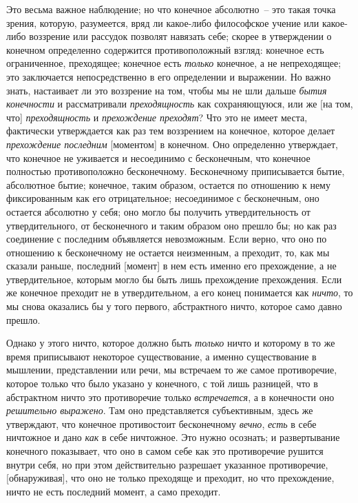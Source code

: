 Это весьма важное наблюдение; но что конечное
абсолютно~-- это такая точка зрения, которую, разумеется,
вряд ли какое-либо философское учение или какое-либо
воззрение или рассудок позволят навязать себе;
скорее в утверждении о конечном определенно содержится
противоположный взгляд: конечное есть ограниченное,
преходящее; конечное есть \emph{только} конечное, а не непреходящее;
это заключается непосредственно в его определении
и выражении. Но важно знать, настаивает ли это
воззрение на том, чтобы мы не шли дальше \emph{бытия конечности}
и рассматривали \emph{преходящность} как сохраняющуюся,
или же [на том, что] \emph{преходящность} и \emph{прехождение
преходят}? Что это не имеет места, фактически утверждается
как раз тем воззрением на конечное, которое
делает \emph{прехождение последним} [моментом] в конечном.
Оно определенно утверждает, что конечное не уживается
и несоединимо с бесконечным, что конечное полностью
противоположно бесконечному. Бесконечному приписывается
бытие, абсолютное бытие; конечное, таким
образом, остается по отношению к нему фиксированным
как его отрицательное; несоединимое с бесконечным, оно
остается абсолютно у себя; оно могло бы получить утвердительность
от утвердительного, от бесконечного и таким
образом оно прешло бы; но как раз соединение с последним
объявляется невозможным. Если верно, что оно по
отношению к бесконечному не остается неизменным, а
преходит, то, как мы сказали раньше, последний [момент]
в нем есть именно его прехождение, а не утвердительное,
которым могло бы быть лишь прехождение прехождения.
Если же конечное преходит не в утвердительном, а его конец
понимается как \emph{ничто}, то мы снова оказались бы у того
первого, абстрактного ничто, которое само давно прешло.

Однако у этого ничто, которое должно быть \emph{только}
ничто и которому в то же время приписывают некоторое
существование, а именно существование в мышлении,
представлении или речи, мы встречаем то же самое противоречие,
которое только что было указано у конечного,
с той лишь разницей, что в абстрактном ничто это противоречие
только \emph{встречается}, а в конечности оно \emph{решительно
выражено}. Там оно представляется субъективным,
здесь же утверждают, что конечное противостоит бесконечному
\emph{вечно}, \emph{есть} в себе ничтожное и дано \emph{как} в себе
ничтожное. Это нужно осознать; и развертывание конечного
показывает, что оно в самом себе как это противоречие
рушится внутри себя, но при этом действительно
разрешает указанное противоречие, [обнаруживая], что
оно не только преходяще и преходит, но что прехождение,
ничто не есть последний момент, а само преходит.


